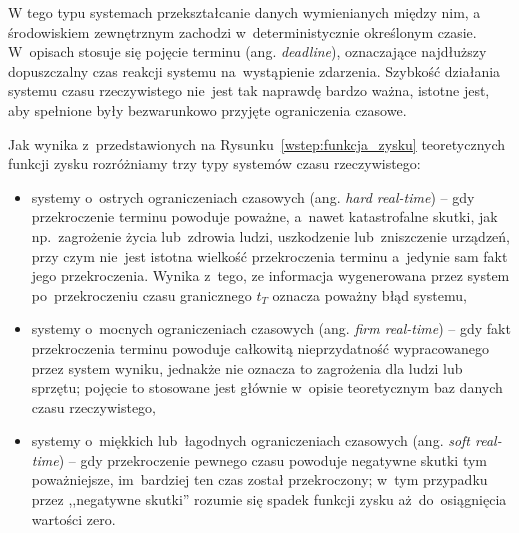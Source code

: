 W tego typu systemach przekształcanie danych wymienianych między nim, a środowiskiem zewnętrznym zachodzi w~deterministycznie określonym czasie. W~opisach stosuje się pojęcie terminu (ang. \textit{deadline}), oznaczające najdłuższy dopuszczalny czas reakcji systemu na~wystąpienie zdarzenia. Szybkość działania systemu czasu rzeczywistego nie~jest tak naprawdę bardzo ważna, istotne jest, aby spełnione były bezwarunkowo przyjęte ograniczenia czasowe.
\clearpage

\vspace{-0.5cm}
Jak wynika z~przedstawionych na Rysunku~\ref{wstep:funkcja_zysku} teoretycznych funkcji zysku rozróżniamy trzy typy systemów czasu rzeczywistego:
\begin{itemize}
\item systemy o~ostrych ograniczeniach czasowych (ang. \textit{hard real-time}) -- gdy przekroczenie terminu powoduje poważne, a~nawet katastrofalne skutki, jak np.~zagrożenie życia lub~zdrowia ludzi, uszkodzenie lub~zniszczenie urządzeń, przy czym nie~jest istotna wielkość przekroczenia terminu a~jedynie sam fakt jego przekroczenia. Wynika z~tego, ze informacja wygenerowana przez system po~przekroczeniu czasu granicznego $t_T$ oznacza poważny błąd systemu,

\item systemy o~mocnych ograniczeniach czasowych (ang. \textit{firm real-time}) -- gdy fakt przekroczenia terminu powoduje całkowitą nieprzydatność wypracowanego przez system wyniku, jednakże nie oznacza to zagrożenia dla ludzi lub sprzętu; pojęcie to stosowane jest głównie w~opisie teoretycznym baz danych czasu rzeczywistego,

\item systemy o~miękkich lub~łagodnych ograniczeniach czasowych (ang. \textit{soft real-time}) -- gdy przekroczenie pewnego czasu powoduje negatywne skutki tym poważniejsze, im~bardziej ten czas został przekroczony; w~tym przypadku przez ,,negatywne skutki'' rozumie się spadek funkcji zysku aż~do~osiągnięcia wartości zero.
\end{itemize}

